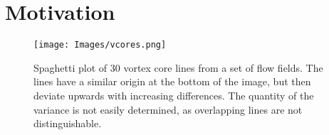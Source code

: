 \chapter{Motivation}

\begin{figure}[ht]
    \centering
    \texttt{[image: Images/vcores.png]}
    \caption{Spaghetti plot of 30 vortex core lines from a set of flow
    fields. The lines have a similar origin at the bottom of the image,
    but then deviate upwards with increasing differences. The quantity
    of the variance is not easily determined, as overlapping lines are
    not distinguishable.}
    \label{fig:spaghetti}
\end{figure}

